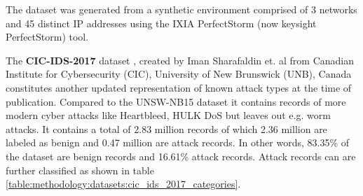 The dataset was generated from a synthetic environment comprised of 3 networks and 45 distinct IP addresses using the IXIA PerfectStorm (now keysight PerfectStorm) tool.

The \textbf{CIC-IDS-2017} dataset \cite{cic_ids_2017}, created by Iman Sharafaldin et. al from Canadian Institute for Cybersecurity (CIC), University of New Brunswick (UNB), Canada constitutes another updated representation of known attack types at the time of publication. Compared to the UNSW-NB15 dataset it contains records of more modern cyber attacks like Heartbleed, HULK DoS but leaves out e.g. worm attacks. It contains a total of 2.83 million records of which 2.36 million are labeled as benign and 0.47 million are attack records. In other words, 83.35\% of the dataset are benign records and 16.61\% attack records. Attack records can are further classified as shown in table \ref{table:methodology:datasets:cic_ids_2017_categories}.

